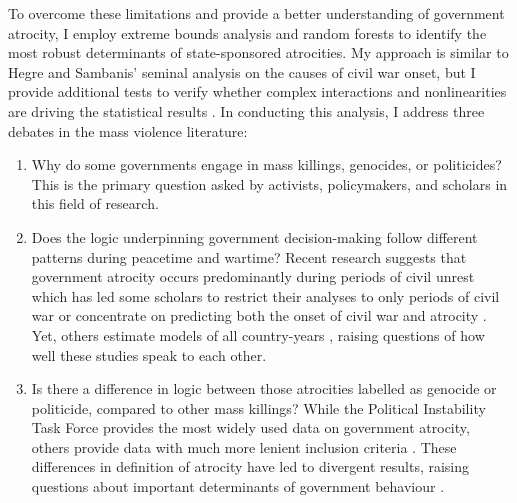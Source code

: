 \documentclass[a4paper,12pt]{article}
\begin{document}
To overcome these limitations and provide a better understanding of government atrocity, I employ extreme bounds analysis and random forests to identify the most robust determinants of state-sponsored atrocities. My approach is similar to Hegre and Sambanis' \citeyear{hegre2006sensitivity} seminal analysis on the causes of civil war onset, but I provide additional tests to verify whether complex interactions and nonlinearities are driving the statistical results \citep{bell2015examining,jones2015exploratory,jones2018there,muchlinski2015comparing}. In conducting this analysis, I address three debates in the mass violence literature:
	
\begin{enumerate}
 \item Why do some governments engage in mass killings, genocides, or politicides? This is the primary question asked by activists, policymakers, and scholars in this field of research. 
 \item Does the logic underpinning government decision-making follow different patterns during peacetime and wartime? Recent research suggests that government atrocity occurs predominantly during periods of civil unrest \citep{harff2003no} which has led some scholars to restrict their analyses to only periods of civil war \citep[e.g.,][]{colaresi2008kill, valentino2004draining} or concentrate on predicting both the onset of civil war and atrocity \citep{goldsmith2013forecasting}. Yet, others estimate models of all country-years \citep[e.g.,][]{krain1997state, montalvo2008discrete}, raising questions of how well these studies speak to each other.
 \item Is there a difference in logic between those atrocities labelled as genocide or politicide, compared to other mass killings? While the Political Instability Task Force \citep{marshall2017pitf} provides the most widely used data on government atrocity, others provide data with much more lenient inclusion criteria \citep[e.g.,][]{stanton2015regulating, ulfelder2012forecasting}. These differences in definition of atrocity have led to divergent results, raising questions about important determinants of government behaviour \citep[for discussion, see][]{straus2007second, uzonyi2016domestic, wayman2010explaining}.
\end{enumerate}
\end{document}
